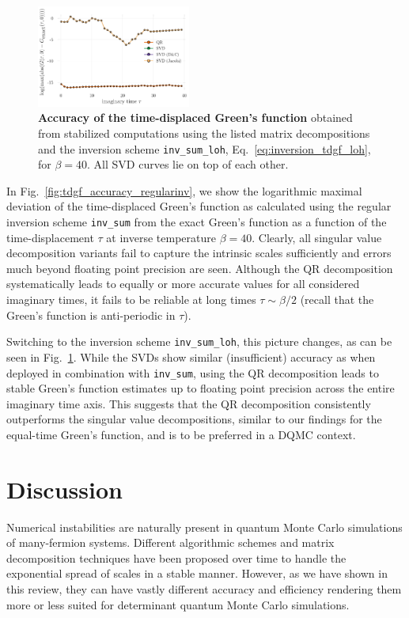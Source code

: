 \documentclass[%
 reprint,
superscriptaddress,
citeautoscript,
showpacs,
 amsmath,amssymb,
 aps,
 prb,
longbibliography,
]{revtex4-2}
\begin{document}
\begin{figure}
	\includegraphics[width=0.45\textwidth]{figures/accuracy_tdgf_loh.pdf}
	\caption{\textbf{Accuracy of the time-displaced Green's function} obtained from stabilized computations using the listed matrix decompositions and the inversion scheme \texttt{inv\_sum\_loh}, Eq.~\eqref{eq:inversion_tdgf_loh}, for $\beta = 40$. All SVD curves lie on top of each other. \label{fig:tdgf_accuracy_loh}}
\end{figure}
In Fig.~\ref{fig:tdgf_accuracy_regularinv}, we show the logarithmic maximal deviation of the time-displaced Green's function as calculated using the regular inversion scheme \texttt{inv\_sum} from the exact Green's function as a function of the time-displacement $\tau$ at inverse temperature $\beta=40$. Clearly, all singular value decomposition variants fail to capture the intrinsic scales sufficiently and errors much beyond floating point precision are seen. Although the QR decomposition systematically leads to equally or more accurate values for all considered imaginary times, it fails to be reliable at long times $\tau\sim\beta/2$ (recall that the Green's function is anti-periodic in $\tau$).

Switching to the inversion scheme \texttt{inv\_sum\_loh}, this picture changes, as can be seen in Fig.~\ref{fig:tdgf_accuracy_loh}. While the SVDs show similar (insufficient) accuracy as when deployed in combination with \texttt{inv\_sum}, using the QR decomposition leads to stable Green's function estimates up to floating point precision across the entire imaginary time axis. This suggests that the QR decomposition consistently outperforms the singular value decompositions, similar to our findings for the equal-time Green's function, and is to be preferred in a DQMC context.


\section{Discussion}\label{sec:discussion}

Numerical instabilities are naturally present in quantum Monte Carlo simulations of many-fermion systems. Different algorithmic schemes and matrix decomposition techniques have been proposed over time to handle the exponential spread of scales in a stable manner. However, as we have shown in this review, they can have vastly different accuracy and efficiency rendering them more or less suited for determinant quantum Monte Carlo simulations.
\end{document}
